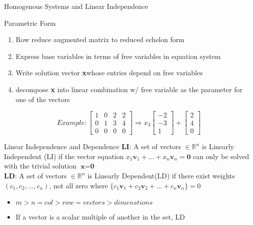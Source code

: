 \documentclass[a4paper, 12pt]{article}
\begin{document}
\begin{section}{Homogenous Systems and Linear Independence}
\begin{subsection}{Parametric Form}
\begin{enumerate}
	\item{Row reduce augmented matrix to reduced echelon form}
	\item{Express base variables in terms of free variables in 
		equation system}
	\item{Write solution vector \textbf{x}whose entries
		depend on free variables}
	\item{decompose \textbf{x} into linear combination w/ free 
		variable as the parameter for one of the vectors}
\end{enumerate}
\begin{equation*}{Example:}
\begin{bmatrix} 
	1 & 0 & 2 & 2 \\
	0 & 1 & 3 & 4 \\
	0 & 0 & 0 & 0
\end{bmatrix} 
\Rightarrow
x_3\begin{bmatrix} -2 \\ -3 \\ 1 \end{bmatrix} +
\begin{bmatrix} 2 \\ 4 \\ 0 \end{bmatrix} 
\end{equation*}
\end{subsection}

\begin{subsection}{Linear Independence and Dependence}
\textbf{LI}:
A set of vectors $\in \mathbb{R}^n$ is Linearly Independent
(LI) if the vector equation
$x_1\textbf{v}_1+\dots+x_n\textbf{v}_n=\textbf{0}$ can only
be solved with the trivial solution $\textbf{x}=\textbf{0}$
\\

\noindent \textbf{LD}:
A set of vectors $\in \mathbb{R}^n$ is Linearly Dependent(LD) if 
there exist weights $(c_1,c_2,\dots,c_n)$, not all zero where
$\lbrace c_1\textbf{v}_1+c_2\textbf{v}_2+\dots+c_n\textbf{v}_n\rbrace=0$
\begin{itemize}
\item{$m>n=col>row=vectors>dimenstions$}
\item{If a vector is a scalar multiple of another in the set, LD}
\end{itemize}
\end{subsection}
\end{section}
\end{document}
